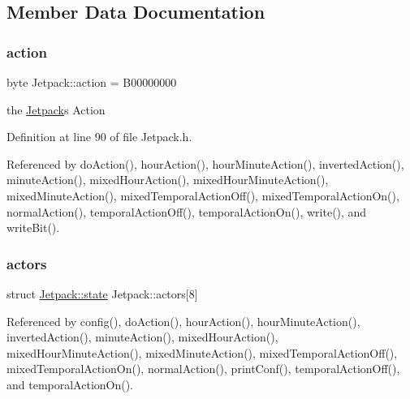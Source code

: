 \subsection{Member Data Documentation}
\mbox{\label{class_jetpack_aca3142925a7b0834b34ae91d26af7765}} 
\subsubsection{\texorpdfstring{action}{action}}
{\footnotesize\ttfamily byte Jetpack\+::action = B00000000\hspace{0.3cm}{\ttfamily [private]}}

the \hyperlink{class_jetpack}{Jetpack}\textquotesingle{}s Action 

Definition at line 90 of file Jetpack.\+h.



Referenced by do\+Action(), hour\+Action(), hour\+Minute\+Action(), inverted\+Action(), minute\+Action(), mixed\+Hour\+Action(), mixed\+Hour\+Minute\+Action(), mixed\+Minute\+Action(), mixed\+Temporal\+Action\+Off(), mixed\+Temporal\+Action\+On(), normal\+Action(), temporal\+Action\+Off(), temporal\+Action\+On(), write(), and write\+Bit().

\mbox{\label{class_jetpack_a7e16d2f97837f9712a2e6de1c50d99db}} 
\subsubsection{\texorpdfstring{actors}{actors}}
{\footnotesize\ttfamily struct \hyperlink{class_jetpack_da/d35/struct_jetpack_1_1state}{Jetpack\+::state} Jetpack\+::actors\mbox{[}8\mbox{]}\hspace{0.3cm}{\ttfamily [private]}}



Referenced by config(), do\+Action(), hour\+Action(), hour\+Minute\+Action(), inverted\+Action(), minute\+Action(), mixed\+Hour\+Action(), mixed\+Hour\+Minute\+Action(), mixed\+Minute\+Action(), mixed\+Temporal\+Action\+Off(), mixed\+Temporal\+Action\+On(), normal\+Action(), print\+Conf(), temporal\+Action\+Off(), and temporal\+Action\+On().

\mbox{\label{class_jetpack_a58ebb991f358f3ae94e82148b0221b5a}} 
